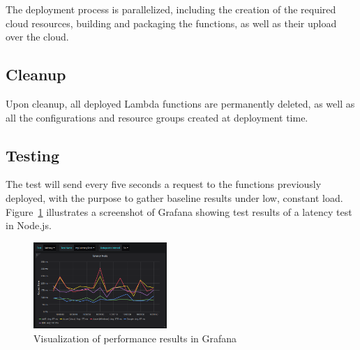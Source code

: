 The deployment process is parallelized, including the creation of the required cloud resources, building and packaging the functions, as well as their upload over the cloud.
 

\subsection{Cleanup}
Upon cleanup, all deployed Lambda functions are permanently deleted, as well as all the configurations and resource groups created at deployment time. %

\subsection{Testing}
The test will send every five seconds a request to the functions previously deployed, with the purpose to gather baseline results under low, constant load. %
Figure~\ref{fig:grafana} illustrates a screenshot of Grafana showing test results of a latency test in Node.js. 

\begin{figure}[!t]
\begin{center}
\includegraphics[width=0.45\textwidth]{bilder/grafana.png}
\caption{Visualization of performance results in Grafana}
\label{fig:grafana}
\end{center}
\end{figure}

